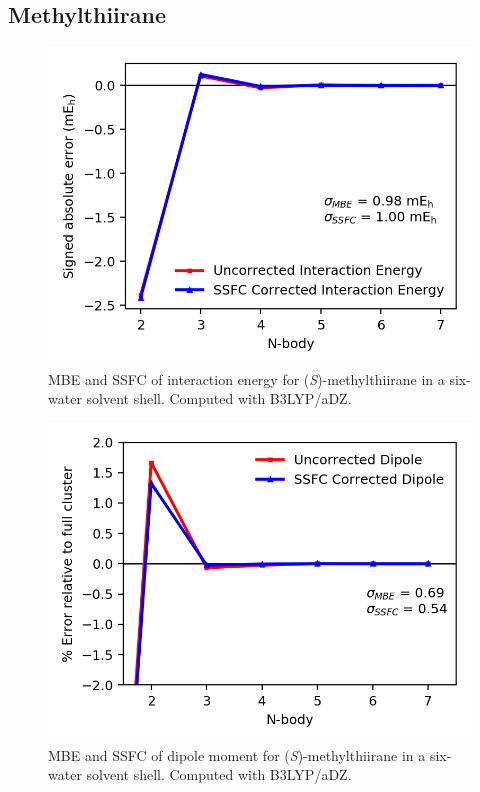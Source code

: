     \subsection{Methylthiirane}
    \begin{figure}
        \centering
        \includegraphics[scale=0.75]{p1/graphs/si/metthi_6_b3_int.png}
        \caption{MBE and SSFC of interaction energy for (\textit{S})-methylthiirane in a six-water solvent shell. Computed with B3LYP/aDZ.}
        \label{metthi_6_b3_int}
    \end{figure}
    \begin{figure}
        \centering
        \includegraphics[scale=0.75]{p1/graphs/si/metthi_6_b3_dip.png}
        \caption{MBE and SSFC of dipole moment for (\textit{S})-methylthiirane in a six-water solvent shell. Computed with B3LYP/aDZ.}
        \label{metthi_6_b3_dip}
    \end{figure}

